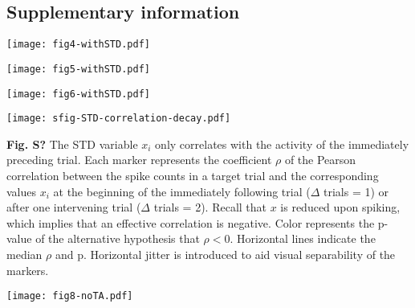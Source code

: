 \documentclass[pdflatex,referee,iicol,sn-basic]{sn-jnl}
\begin{document}
\begin{appendices}

\section{Supplementary information}\label{secA1}

\begin{figure*}%
    \centering
    \texttt{[image: fig4-withSTD.pdf]}
    \caption{}
    \label{sfig4}
\end{figure*}

\begin{figure*}%
    \centering
    \texttt{[image: fig5-withSTD.pdf]}
    \caption{}
    \label{sfig5}
\end{figure*}

\begin{figure*}%
    \centering
    \texttt{[image: fig6-withSTD.pdf]}
    \caption{}
    \label{sfig6}
\end{figure*}

\begin{figure*}%
    \centering
    \texttt{[image: sfig-STD-correlation-decay.pdf]}
    \caption{}
    \label{sfig-STD-correlation-decay}
\end{figure*}
\textbf{Fig. S?} The STD variable $x_i$ only correlates with the activity of the immediately preceding trial. Each marker represents the coefficient $\rho$ of the Pearson correlation between the spike counts in a target trial and the corresponding values $x_i$ at the beginning of the immediately following trial ($\Delta$ trials = 1) or after one intervening trial ($\Delta$ trials = 2). Recall that $x$ is reduced upon spiking, which implies that an effective correlation is negative. Color represents the p-value of the alternative hypothesis that $\rho < 0$. Horizontal lines indicate the median $\rho$ and p. Horizontal jitter is introduced to aid visual separability of the markers.

\begin{figure*}%
    \centering
    \texttt{[image: fig8-noTA.pdf]}
    \caption{}
    \label{sfig8}
\end{figure*}




\end{appendices}
\end{document}
